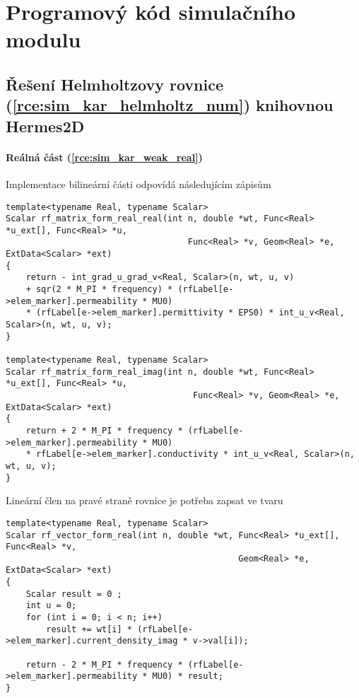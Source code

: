 \chapter{Programový kód simulačního modulu} \label{kap:Program_kod}
\section{Řešení Helmholtzovy rovnice (\ref{rce:sim_kar_helmholtz_num}) knihovnou Hermes2D}
\subsubsection*{Reálná část (\ref{rce:sim_kar_weak_real})}
Implementace bilineární části odpovídá následujícím zápisům
\begin{verbatim}
template<typename Real, typename Scalar>
Scalar rf_matrix_form_real_real(int n, double *wt, Func<Real> *u_ext[], Func<Real> *u,
                                    Func<Real> *v, Geom<Real> *e, ExtData<Scalar> *ext)
{
    return - int_grad_u_grad_v<Real, Scalar>(n, wt, u, v)
    + sqr(2 * M_PI * frequency) * (rfLabel[e->elem_marker].permeability * MU0)
    * (rfLabel[e->elem_marker].permittivity * EPS0) * int_u_v<Real, Scalar>(n, wt, u, v);
}

template<typename Real, typename Scalar>
Scalar rf_matrix_form_real_imag(int n, double *wt, Func<Real> *u_ext[], Func<Real> *u,
                                     Func<Real> *v, Geom<Real> *e, ExtData<Scalar> *ext)
{
    return + 2 * M_PI * frequency * (rfLabel[e->elem_marker].permeability * MU0) 
    * rfLabel[e->elem_marker].conductivity * int_u_v<Real, Scalar>(n, wt, u, v);
}

\end{verbatim}
Lineární člen na pravé straně rovnice je potřeba zapsat ve tvaru
\begin{verbatim}
template<typename Real, typename Scalar>
Scalar rf_vector_form_real(int n, double *wt, Func<Real> *u_ext[], Func<Real> *v,
                                              Geom<Real> *e, ExtData<Scalar> *ext)
{
    Scalar result = 0 ;
    int u = 0;
    for (int i = 0; i < n; i++)
        result += wt[i] * (rfLabel[e->elem_marker].current_density_imag * v->val[i]);

    return - 2 * M_PI * frequency * (rfLabel[e->elem_marker].permeability * MU0) * result;
}
\end{verbatim}


